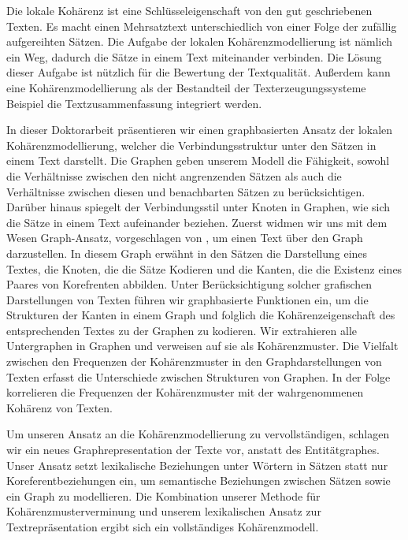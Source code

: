 \addchap*{\abstractname}

Die lokale Kohärenz ist eine Schlüsseleigenschaft von den gut geschriebenen Texten. Es macht einen Mehrsatztext unterschiedlich von einer Folge der zufällig aufgereihten Sätzen.
Die Aufgabe der lokalen Kohärenzmodellierung ist nämlich ein Weg, dadurch die Sätze in einem Text miteinander verbinden.
Die Lösung dieser Aufgabe ist nützlich für die Bewertung der Textqualität.
Außerdem kann eine Kohärenzmodellierung als der Bestandteil der Texterzeugungssysteme Beispiel die Textzusammenfassung integriert werden.

In dieser Doktorarbeit präsentieren wir einen graphbasierten Ansatz der lokalen Kohärenzmodellierung, welcher die Verbindungsstruktur unter den Sätzen in einem Text darstellt.
Die Graphen geben unserem Modell die Fähigkeit, sowohl die Verhältnisse zwischen den nicht angrenzenden Sätzen als auch die Verhältnisse zwischen diesen und benachbarten Sätzen zu berücksichtigen. 
Darüber hinaus spiegelt der Verbindungsstil unter Knoten in Graphen, wie sich die Sätze in einem Text aufeinander beziehen.
Zuerst widmen wir uns mit dem Wesen Graph-Ansatz, vorgeschlagen von , um einen Text über den Graph darzustellen.
In diesem Graph erwähnt in den Sätzen die Darstellung eines Textes, die Knoten, die die Sätze  Kodieren und die Kanten, die die Existenz eines Paares von Korefrenten abbilden.
Unter Berücksichtigung solcher grafischen Darstellungen von Texten führen wir graphbasierte Funktionen ein, um die Strukturen der Kanten in einem Graph und folglich die Kohärenzeigenschaft des entsprechenden Textes zu der Graphen zu kodieren.
Wir extrahieren alle Untergraphen in Graphen und verweisen auf sie als Kohärenzmuster.
Die Vielfalt zwischen den Frequenzen der Kohärenzmuster in den Graphdarstellungen von Texten erfasst die Unterschiede zwischen Strukturen von Graphen.
In der Folge korrelieren die Frequenzen der Kohärenzmuster mit der wahrgenommenen Kohärenz von Texten.

Um unseren Ansatz an die Kohärenzmodellierung zu vervollständigen, schlagen wir ein neues Graphrepresentation der Texte vor, anstatt des Entitätgraphes.
Unser Ansatz setzt lexikalische Beziehungen unter Wörtern in Sätzen statt nur Koreferentbeziehungen ein, um semantische Beziehungen zwischen Sätzen sowie ein Graph zu modellieren.
Die Kombination unserer Methode für Kohärenzmusterverminung und unserem lexikalischen Ansatz
zur Textrepräsentation ergibt sich ein vollständiges Kohärenzmodell.

